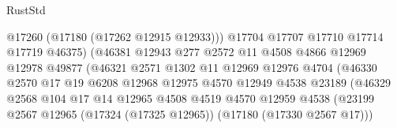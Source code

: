 \begin{lexlean}{RustStd}
\begin{coremodule}
{\begin{coremodule}
{{{{{{{{{{{{{{{{{{{{{{{{{{{{{{{{{{{{{{{{{{{{{{{{{{{{{{{                                          @17260
                                          (@17180 (@17262 @12915 @12933)))
                                        @17704
                                        @17707
                                        @17710
                                        @17714
                                        @17719
                                        @46375)
                                      (@46381
                                        @12943
                                        @277
                                        @2572
                                        @11
                                        @4508
                                        @4866
                                        @12969
                                        @12978
                                        @49877
                                        (@46321
                                          @2571
                                          @1302
                                          @11
                                          @12969
                                          @12976
                                          @4704
                                          (@46330
                                            @2570
                                            @17
                                            @19
                                            @6208
                                            @12968
                                            @12975
                                            @4570
                                            @12949
                                            @4538
                                            @23189
                                            (@46329
                                              @2568
                                              @104
                                              @17
                                              @14
                                              @12965
                                              @4508
                                              @4519
                                              @4570
                                              @12959
                                              @4538
                                              (@23199
                                                @2567
                                                @12965
                                                (@17324 (@17325 @12965))
                                                (@17180 (@17330 @2567 @17)))
}}}}}}}}}}}}}}}}}}}}}}}}}}}}}}}}}}}}}}}}}}}}}}}}}}}}}}}
\end{coremodule}}
\end{coremodule}
\end{lexlean}
